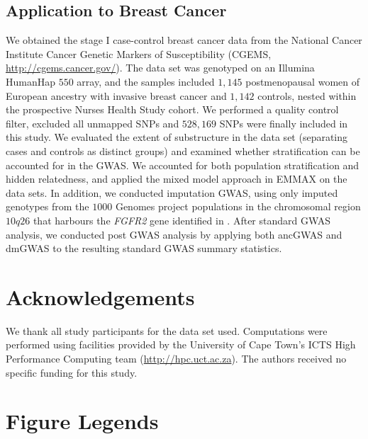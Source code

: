 \documentclass[10pt]{article}
\begin{document}
{\subsection*{Application to Breast Cancer}
\label{anccancer}

We obtained the stage I case-control breast cancer data \cite{hunter} from the National Cancer Institute Cancer Genetic Markers of Susceptibility (CGEMS, \url{http://cgems.cancer.gov/}). The data set was genotyped on an Illumina HumanHap $550$ array, and the samples included $1,145$ postmenopausal women of European ancestry with invasive breast cancer and $1,142$ controls, nested within the prospective Nurses Health Study cohort. We performed a quality control filter, excluded all unmapped SNPs and $528,169$ SNPs were finally included in this study. We evaluated the extent of substructure in the data set (separating cases and controls as distinct groups) and examined whether stratification can be accounted for in the GWAS. We accounted for both population stratification and hidden relatedness, and applied the mixed model approach in EMMAX \cite{emax1} on the data sets. In addition, we conducted imputation \cite{marchi} GWAS, using only imputed genotypes from the $1000$ Genomes project \cite{1000g} populations in the chromosomal region $10q26$ that harbours the \textit{FGFR2} gene identified in \cite{hunter}. After standard GWAS analysis, we conducted post GWAS analysis by applying both ancGWAS and dmGWAS to the resulting standard GWAS summary statistics.

\section*{Acknowledgements}

We thank all study participants for the data set used. Computations were performed using facilities provided by the University of Cape Town's ICTS High Performance Computing team (\url{http://hpc.uct.ac.za}). 
The authors received no specific funding for this study.	


\newpage


\section*{Figure Legends} %

}
\end{document}
